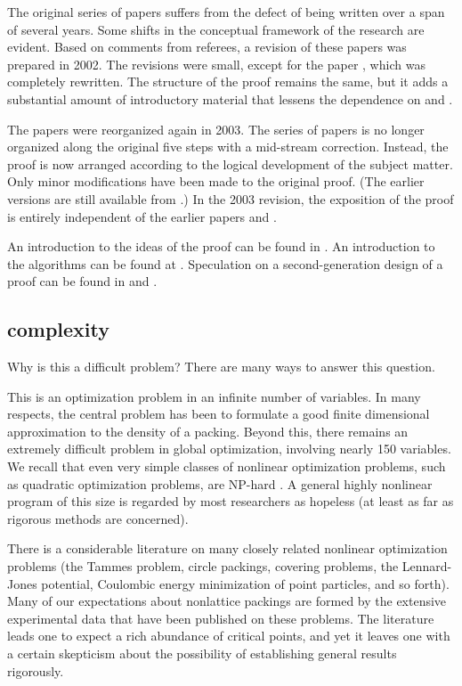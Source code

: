 The original series of papers suffers from the defect of being
written over a span of several years.  Some shifts in the
conceptual framework of the research are evident.   Based on
comments from referees, a revision of these papers was prepared in
2002. The revisions were small, except for the paper
\cite{Hal98D}, which was completely rewritten. The structure of
the proof remains the same, but it adds a substantial amount of
introductory material that lessens the dependence on \cite{part1}
and \cite{part2}.

The papers were reorganized again in 2003.  The series of papers
is no longer organized along the original five steps with a
mid-stream correction.  Instead, the proof is now arranged
according to the logical development of the subject matter.  Only
minor modifications have been made to the original proof.  (The
earlier versions are still available from \cite{arXiv}.)  In the
2003 revision, the exposition of the proof is entirely independent
of the earlier papers \cite{part1} and \cite{part2}.

An introduction to the ideas of the proof can be found in
\cite{CH}. An introduction to the algorithms can be found at
\cite{algorithm}. Speculation on a second-generation design of a
proof can be found in \cite{algorithm} and \cite{arbeitstagung}.


\subsection{complexity}

Why is this a difficult problem?  There are many ways to answer this
question.

This is an optimization problem in an infinite number of
variables.  In many respects, the central problem has been to
formulate a good finite dimensional approximation to the density
of a packing.  Beyond this, there remains an extremely difficult
problem in global optimization, involving nearly 150 variables.
We recall that even very simple classes of nonlinear optimization
problems, such as quadratic optimization problems, are NP-hard
\cite{HoPT95}.  A general highly nonlinear program of this size is
regarded by most researchers as hopeless (at least as far as
rigorous methods are concerned).

There is a considerable literature on many closely related nonlinear
optimization problems (the Tammes problem, circle packings, covering
problems, the Lennard-Jones potential, Coulombic energy minimization
of point particles, and so forth). Many of our expectations about
nonlattice packings are formed by the extensive experimental data
that have been published on these problems. The literature leads one
to expect a rich abundance of critical points, and yet it leaves one
with a certain skepticism about the possibility of establishing
general results rigorously.

